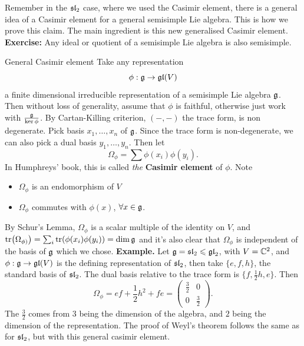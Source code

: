\documentclass{article}
\begin{document}
\idea Remember in the $\mathfrak{sl}_{2}$ case, where we used the Casimir element, there is a general idea of a Casimir element for a general semisimple Lie algebra. This is how we prove this claim.
\proof The main ingredient is this new generalised Casimir element. \gap \textbf{Exercise: } Any ideal or quotient of a semisimple Lie algebra is also semisimple.
\begin{fancydefine}{General Casimir element}
    Take any representation \[ \phi : \mathfrak{g} \to \mathfrak{gl}(V)\] a finite dimensional irreducible representation of a semisimple Lie algebra $\mathfrak{g}$. Then without loss of generality, assume that $\phi$ is faithful, otherwise just work with $\frac{\mathfrak{g}}{\ker \phi}$. By Cartan-Killing criterion, $(-,-)$ the trace form, is non degenerate. Pick basis $x_{1}, \dots , x_{n}$ of $\mathfrak{g}$. Since the trace form is non-degenerate, we can also pick a dual basis $y_{1}, \dots, y_{n}$. Then let \[ \Omega_{\phi} = \sum \phi(x_{i})\phi(y_{i}).\]
    In Humphreys' book, this is called \textit{the} \textbf{Casimir element} of $\phi$. Note \begin{itemize}
        \item $\Omega_{\phi}$ is an endomorphism of $V$
        \item $\Omega_{\phi}$ commutes with $\phi(x)$, $\forall x \in \mathfrak{g}$.
    \end{itemize}
\end{fancydefine}
By Schur's Lemma, $\Omega_{\phi}$ is a scalar multiple of the identity on $V$, and $\tr(\Omega_{\phi)}) = \sum_{i} \tr(\phi(x_{i})\phi(y_{i})) = \dim \mathfrak{g}$ and it's also clear that $\Omega_{\phi}$ is independent of the basis of $\mathfrak{g}$ which we chose. \gap
\textbf{Example. } Let $\mathfrak{g} = \mathfrak{sl}_{2} \leqslant \mathfrak{gl}_{2}$, with $V= \mathbb{C}^{2}$, and $\phi : \mathfrak{g} \to \mathfrak{gl}(V)$ is the defining representation of $\mathfrak{sl}_{2}$, then take $\{e, f, h\}$, the standard basis of $\mathfrak{sl}_{2}$. The dual basis relative to the trace form is $\{f, \frac{1}{2}h, e \}$. Then \[ \Omega_{\phi} = ef + \frac{1}{2}h^{2} +fe = \begin{pmatrix}
    \frac{3}{2} & 0 \\ 
    0 & \frac{3}{2}
\end{pmatrix}. \] The $\frac{3}{2}$ comes from $3$ being the dimension of the algebra, and $2$ being the dimension of the representation. 
The proof of Weyl's theorem follows the same as for $\mathfrak{sl}_{2}$, but with this general casimir element.
\end{document}
